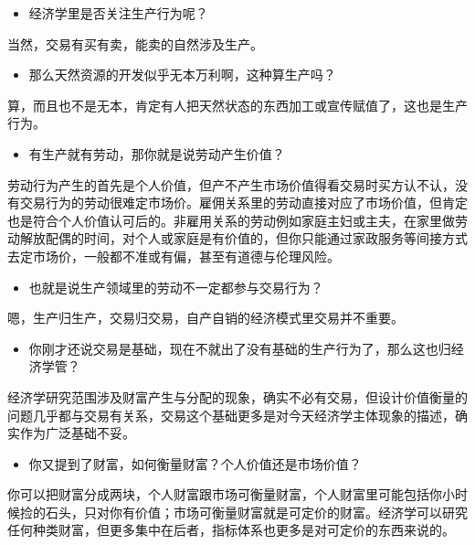 \documentclass[
  letterpaper,
  DIV=11,
  numbers=noendperiod]{scrreprt}
\providecommand{\tightlist}{%
  \setlength{\itemsep}{0pt}\setlength{\parskip}{0pt}}\usepackage{longtable,booktabs,array}
\begin{document}
\begin{itemize}
\tightlist
\item
  经济学里是否关注生产行为呢？
\end{itemize}

当然，交易有买有卖，能卖的自然涉及生产。

\begin{itemize}
\tightlist
\item
  那么天然资源的开发似乎无本万利啊，这种算生产吗？
\end{itemize}

算，而且也不是无本，肯定有人把天然状态的东西加工或宣传赋值了，这也是生产行为。

\begin{itemize}
\tightlist
\item
  有生产就有劳动，那你就是说劳动产生价值？
\end{itemize}

劳动行为产生的首先是个人价值，但产不产生市场价值得看交易时买方认不认，没有交易行为的劳动很难定市场价。雇佣关系里的劳动直接对应了市场价值，但肯定也是符合个人价值认可后的。非雇用关系的劳动例如家庭主妇或主夫，在家里做劳动解放配偶的时间，对个人或家庭是有价值的，但你只能通过家政服务等间接方式去定市场价，一般都不准或有偏，甚至有道德与伦理风险。

\begin{itemize}
\tightlist
\item
  也就是说生产领域里的劳动不一定都参与交易行为？
\end{itemize}

嗯，生产归生产，交易归交易，自产自销的经济模式里交易并不重要。

\begin{itemize}
\tightlist
\item
  你刚才还说交易是基础，现在不就出了没有基础的生产行为了，那么这也归经济学管？
\end{itemize}

经济学研究范围涉及财富产生与分配的现象，确实不必有交易，但设计价值衡量的问题几乎都与交易有关系，交易这个基础更多是对今天经济学主体现象的描述，确实作为广泛基础不妥。

\begin{itemize}
\tightlist
\item
  你又提到了财富，如何衡量财富？个人价值还是市场价值？
\end{itemize}

你可以把财富分成两块，个人财富跟市场可衡量财富，个人财富里可能包括你小时候捡的石头，只对你有价值；市场可衡量财富就是可定价的财富。经济学可以研究任何种类财富，但更多集中在后者，指标体系也更多是对可定价的东西来说的。
\end{document}
